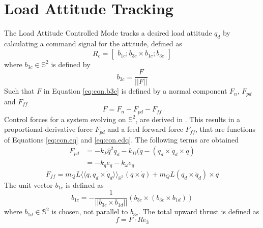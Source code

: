 \section{Load Attitude Tracking}




The Load Attitude Controlled Mode tracks a desired load attitude $ q_d $ by calculating a command signal for the  attitude, defined as
\begin{equation}\label{eq:con.R}
R_c = \begin{bmatrix}
b_{1c}; b_{3c}\times b_{1c};b_{3c}
\end{bmatrix}
\end{equation}
where $ b_{3c} \in \mathbb{S}^2 $ is defined by 
\begin{equation}\label{eq:con.b3c}
b_{3c}=\frac{F}{||F||}
\end{equation}
Such that $ F $ in Equation \ref{eq:con.b3c} is defined by a normal component $ F_n $, $ F_{pd} $ and $ F_{ff}$
\begin{equation}\label{key}
F=F_n-F_{pd}-F_{ff}
\end{equation}
 Control forces for a system evolving on $ \mathbb{S}^2 $, are derived in \cite{Bullo2005}. 
 This results in a proportional-derivative force $ F_{pd} $ and a feed forward force $ F_{ff} $, that are functions of Equations \ref{eq:con.eq} and \ref{eq:con.edq}. The following terms are obtained
\begin{equation}\label{key}
\begin{aligned}
F_{pd}&=-k_P\hat{q}^2q_d-k_D(\dot{q}-(q_d\times\dot{q}_d\times q)\\
&=-k_qe_q-k_\omega e_{\dot{q}}
\end{aligned}
\end{equation}
\begin{equation}\label{key}
F_{ff}=m_QL\langle\langle q,q_d\times\dot{q}_d\rangle\rangle_{\mathbb{R}^3}(q\times \dot{q})+m_QL(q_d\times \ddot{q}_d)\times q
\end{equation}
The unit vector $ b_{1c} $ is defined as
\begin{equation}\label{key}
b_{1c}=-\frac{1}{||b_{3c}\times b_{1d}||}(b_{3c}\times(b_{3c}\times b_{1d}))
\end{equation}
where $ b_{1d}\in \mathbb{S}^2 $ is chosen, not parallel to $ b_{3c} $.
The total upward thrust is defined as
\begin{equation}\label{key}
f=F\cdot Re_3
\end{equation}

